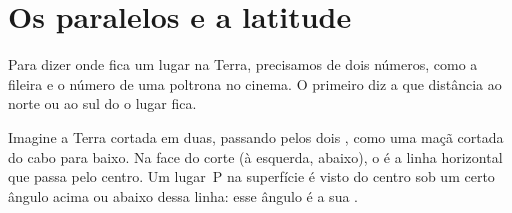 \section{Os paralelos e a latitude}

Para dizer onde fica um lugar na Terra, precisamos de dois números, como a
fileira e o número de uma poltrona no cinema. O primeiro diz a que
distância ao norte ou ao sul do  o lugar fica.

Imagine a Terra cortada em duas, passando pelos dois , como uma maçã
cortada do cabo para baixo. Na face do corte (à esquerda, abaixo), o
 é a linha horizontal que passa pelo centro. Um lugar~P na
superfície é visto do centro sob um certo ângulo acima ou abaixo dessa
linha: esse ângulo é a sua .

